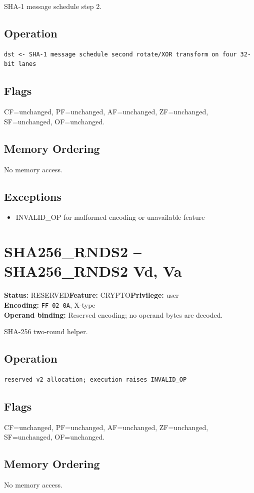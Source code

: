 \documentclass[10pt]{article}
\begin{document}
SHA-1 message schedule step 2.

\subsection*{Operation}
\begin{lstlisting}
dst <- SHA-1 message schedule second rotate/XOR transform on four 32-bit lanes
\end{lstlisting}
\subsection*{Flags}
CF=unchanged, PF=unchanged, AF=unchanged, ZF=unchanged, SF=unchanged, OF=unchanged.
\subsection*{Memory Ordering}
No memory access.
\subsection*{Exceptions}
\begin{itemize}
\item INVALID\_OP for malformed encoding or unavailable feature
\end{itemize}
\clearpage

\section{SHA256\_RNDS2 -- SHA256\_RNDS2 Vd, Va}
\textbf{Status:} RESERVED\quad \textbf{Feature:} CRYPTO\quad \textbf{Privilege:} user\\
\textbf{Encoding:} \texttt{FF 02 0A}, X-type\\
\textbf{Operand binding:} Reserved encoding; no operand bytes are decoded.

SHA-256 two-round helper.

\subsection*{Operation}
\begin{lstlisting}
reserved v2 allocation; execution raises INVALID_OP
\end{lstlisting}
\subsection*{Flags}
CF=unchanged, PF=unchanged, AF=unchanged, ZF=unchanged, SF=unchanged, OF=unchanged.
\subsection*{Memory Ordering}
No memory access.
\end{document}
